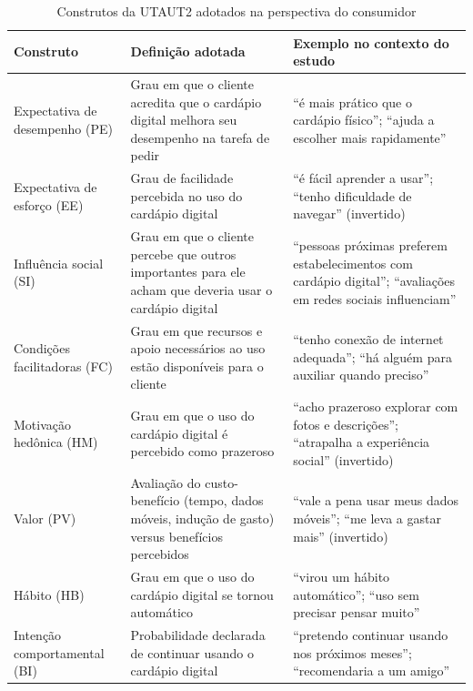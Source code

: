 \begin{table}[!ht]
    \caption{Construtos da UTAUT2 adotados na perspectiva do consumidor}
    \label{tab:utaut2-construtos}
    \centering%
    \begin{minipage}{.98\textwidth}
        \small
        \renewcommand{\arraystretch}{1.3}
        \begin{tabular*}{\linewidth}{@{}p{3.1cm}p{5.2cm}p{5.2cm}@{}}
            \toprule
            \textbf{Construto} & \textbf{Definição adotada} & \textbf{Exemplo no contexto do estudo} \\
            \midrule
            Expectativa de desempenho (PE) & Grau em que o cliente acredita que o cardápio digital melhora seu desempenho na tarefa de pedir & ``é mais prático que o cardápio físico''; ``ajuda a escolher mais rapidamente'' \\
            Expectativa de esforço (EE) & Grau de facilidade percebida no uso do cardápio digital & ``é fácil aprender a usar''; ``tenho dificuldade de navegar'' (invertido) \\
            Influência social (SI) & Grau em que o cliente percebe que outros importantes para ele acham que deveria usar o cardápio digital & ``pessoas próximas preferem estabelecimentos com cardápio digital''; ``avaliações em redes sociais influenciam'' \\
            Condições facilitadoras (FC) & Grau em que recursos e apoio necessários ao uso estão disponíveis para o cliente & ``tenho conexão de internet adequada''; ``há alguém para auxiliar quando preciso'' \\
            Motivação hedônica (HM) & Grau em que o uso do cardápio digital é percebido como prazeroso & ``acho prazeroso explorar com fotos e descrições''; ``atrapalha a experiência social'' (invertido) \\
            Valor (PV) & Avaliação do custo-benefício (tempo, dados móveis, indução de gasto) versus benefícios percebidos & ``vale a pena usar meus dados móveis''; ``me leva a gastar mais'' (invertido) \\
            Hábito (HB) & Grau em que o uso do cardápio digital se tornou automático & ``virou um hábito automático''; ``uso sem precisar pensar muito'' \\
            Intenção comportamental (BI) & Probabilidade declarada de continuar usando o cardápio digital & ``pretendo continuar usando nos próximos meses''; ``recomendaria a um amigo'' \\
            \bottomrule
        \end{tabular*}
    \end{minipage}
\end{table}
